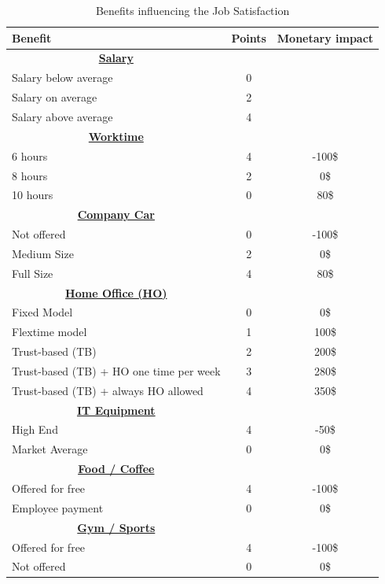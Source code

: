 \begin{table}[]
    \centering
\begin{tabular}{l|c|c}
    \hline
     \textbf{Benefit} & \textbf{Points} & \textbf{Monetary impact} \\
     \hline \hline
     \multicolumn{1}{c|}{\underline{\textbf{Salary}}} & & \\
     Salary below average & 0 &  \\
     Salary on average & 2 &  \\
     Salary above average & 4 &   \\
     \hline
     \multicolumn{1}{c|}{\underline{\textbf{Worktime}}} & & \\
     6 hours & 4 & -100\$  \\
     8 hours & 2 & 0\$  \\
     10 hours & 0 & 80\$  \\
     \hline
     \multicolumn{1}{c|}{\underline{\textbf{Company Car}}} & & \\
     Not offered & 0 & -100\$  \\
     Medium Size & 2 & 0\$  \\
     Full Size & 4 & 80\$  \\
     \hline
     \multicolumn{1}{c|}{\underline{\textbf{Home Office (HO)}}} & & \\
     Fixed Model & 0 & 0\$  \\
     Flextime model & 1 & 100\$  \\
     Trust-based (TB) & 2 & 200\$  \\
     Trust-based (TB) + HO one time per week & 3 & 280\$  \\
     Trust-based (TB) + always HO allowed & 4 & 350\$  \\
     \hline
     \multicolumn{1}{c|}{\underline{\textbf{IT Equipment}}} & & \\
     High End & 4 & -50\$  \\
     Market Average & 0 & 0\$  \\
     \hline
     \multicolumn{1}{c|}{\underline{\textbf{Food / Coffee}}} & & \\
     Offered for free & 4 & -100\$  \\
     Employee payment & 0 & 0\$  \\
     \hline
     \multicolumn{1}{c|}{\underline{\textbf{Gym / Sports}}} & & \\
     Offered for free & 4 & -100\$  \\
     Not offered & 0 & 0\$  \\
     \hline

\end{tabular}
\caption{Benefits influencing the Job Satisfaction}
    \label{tab:benefitsJSS}
\end{table}

